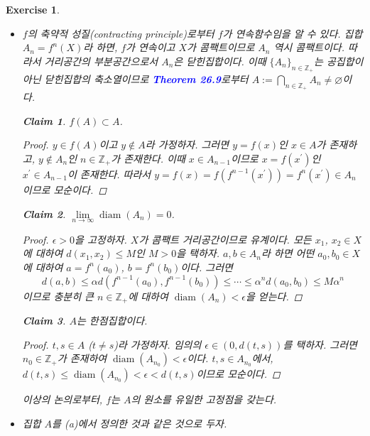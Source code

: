 \documentclass{article}
\newtheorem{exercise}{Exercise}[section]
\newtheorem*{claim}{Claim}
\newcommand{\Z}{\mathbb{Z}}
\begin{document}
\begin{exercise}
    \phantom{}
    \begin{itemize}
        \item[(a)] $f$의 축약적 성질(contracting principle)로부터 $f$가 연속함수임을 알 수 있다. 집합 $A_n=f^n(X)$라 하면, $f$가 연속이고 $X$가 콤팩트이므로 $A_n$ 역시 콤팩트이다. 따라서 거리공간의 부분공간으로서 $A_n$은 닫힌집합이다. 이때 $\{A_n\}_{n\in\Z_+}$는 공집합이 아닌 닫힌집합의 축소열이므로 \textcolor{blue}{\textbf{Theorem 26.9}}로부터 $A:=\bigcap_{n\in\Z_+}A_n\ne\varnothing$이다.
            \begin{claim}
                $f(A)\subset A$.
            \end{claim}
            \begin{proof}
                $y\in f(A)$이고 $y\notin A$라 가정하자. 그러면 $y=f(x)$인 $x\in A$가 존재하고, $y\notin A_n$인 $n\in\Z_+$가 존재한다. 이때 $x\in A_{n-1}$이므로 $x=f(x^\prime)$인 $x^\prime\in A_{n-1}$이 존재한다. 따라서 $y=f(x)=f(f^{n-1}(x^\prime))=f^n(x^\prime)\in A_n$이므로 모순이다.
            \end{proof}
            \begin{claim}
                $\lim\limits_{n\to\infty}\operatorname{diam}(A_n)=0$.
            \end{claim}
            \begin{proof}
                $\epsilon>0$을 고정하자. $X$가 콤팩트 거리공간이므로 유계이다. 모든 $x_1$, $x_2\in X$에 대하여 $d(x_1,x_2)\leq M$인 $M>0$을 택하자. $a,b\in A_n$라 하면 어떤 $a_0,b_0\in X$에 대하여 $a=f^n(a_0)$, $b=f^n(b_0)$이다. 그러면
                \[
                    d(a,b)\leq\alpha d(f^{n-1}(a_0),f^{n-1}(b_0))\leq\cdots\leq\alpha^nd(a_0,b_0)\leq M\alpha^n
                \]
                이므로 충분히 큰 $n\in\Z_+$에 대하여 $\operatorname{diam}(A_n)<\epsilon$을 얻는다.
            \end{proof}
            \begin{claim}
                $A$는 한점집합이다.
            \end{claim}
            \begin{proof}
                $t,s\in A$ ($t\ne s$)라 가정하자. 임의의 $\epsilon\in (0,d(t,s))$를 택하자. 그러면 $n_0\in\Z_+$가 존재하여 $\operatorname{diam}(A_{n_0})<\epsilon$이다. $t,s\in A_{n_0}$에서, $d(t,s)\leq\operatorname{diam}(A_{n_0})<\epsilon<d(t,s)$이므로 모순이다.
            \end{proof}
            이상의 논의로부터, $f$는 $A$의 원소를 유일한 고정점을 갖는다.
        \item[(b)] 집합 $A$를 (a)에서 정의한 것과 같은 것으로 두자.

\end{itemize}
\end{exercise}
\end{document}
